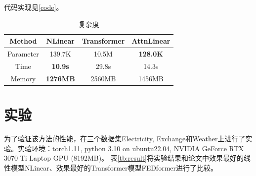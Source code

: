 \documentclass{article}
\begin{document}
代码实现见\ref{code}。

\begin{table}
    \label{tb:complex}
    \caption{复杂度}
    \centering
    \begin{tabular}{cccc}
        \toprule
        Method & NLinear & Transformer & AttnLinear \\
        \midrule
        Parameter  & 139.7K & 10.5M & \textbf{128.0K} \\
        Time & \textbf{10.9s} & 29.8s & 14.3s \\
        Memory & \textbf{1276MB} & 2560MB & 1456MB \\
        \bottomrule
    \end{tabular}
\end{table}

\section{实验}
为了验证该方法的性能，在三个数据集Electricity, Exchange和Weather上进行了实验。实验环境：torch1.11, python 3.10 on ubuntu22.04, NVIDIA GeForce RTX 3070 Ti Laptop GPU (8192MB)。
表\ref{tb:result}将实验结果和论文中效果最好的线性模型NLinear、效果最好的Transformer模型FEDformer进行了比较。
\end{document}
